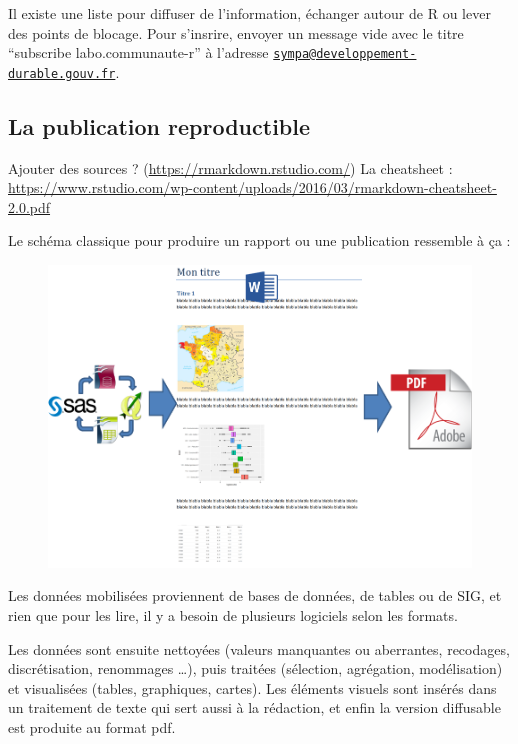\documentclass[]{article}
\begin{document}
Il existe une liste pour diffuser de l'information, échanger autour de R
ou lever des points de blocage. Pour s'insrire, envoyer un message vide
avec le titre ``subscribe labo.communaute-r'' à l'adresse
\href{mailto:sympa@developpement-durable.gouv.fr}{\nolinkurl{sympa@developpement-durable.gouv.fr}}.

\subsection{La publication
reproductible}\label{la-publication-reproductible}

Ajouter des sources ? (\url{https://rmarkdown.rstudio.com/}) La
cheatsheet :
\url{https://www.rstudio.com/wp-content/uploads/2016/03/rmarkdown-cheatsheet-2.0.pdf}

Le schéma classique pour produire un rapport ou une publication
ressemble à ça :

\begin{figure}
\centering
\includegraphics{images/schema_publi.png}
\caption{}
\end{figure}

Les données mobilisées proviennent de bases de données, de tables ou de
SIG, et rien que pour les lire, il y a besoin de plusieurs logiciels
selon les formats.

Les données sont ensuite nettoyées (valeurs manquantes ou aberrantes,
recodages, discrétisation, renommages \ldots{}), puis traitées
(sélection, agrégation, modélisation) et visualisées (tables,
graphiques, cartes). Les éléments visuels sont insérés dans un
traitement de texte qui sert aussi à la rédaction, et enfin la version
diffusable est produite au format pdf.
\end{document}

